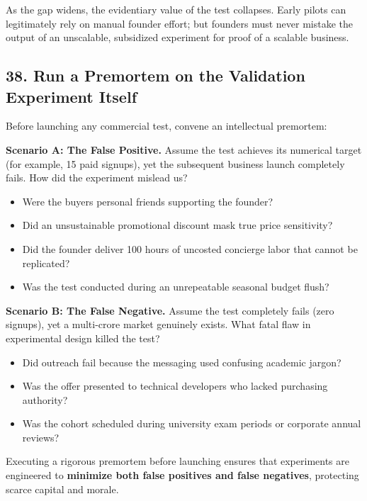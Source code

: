 As the gap widens, the evidentiary value of the test collapses. Early pilots can legitimately rely on manual founder effort; but founders must never mistake the output of an unscalable, subsidized experiment for proof of a scalable business.

\subsection*{38. Run a Premortem on the Validation Experiment Itself}

Before launching any commercial test, convene an intellectual premortem:

\textbf{Scenario A: The False Positive.} Assume the test achieves its numerical target (for example, 15 paid signups), yet the subsequent business launch completely fails. How did the experiment mislead us?
\begin{itemize}
    \item Were the buyers personal friends supporting the founder?
    \item Did an unsustainable promotional discount mask true price sensitivity?
    \item Did the founder deliver 100 hours of uncosted concierge labor that cannot be replicated?
    \item Was the test conducted during an unrepeatable seasonal budget flush?
\end{itemize}

\textbf{Scenario B: The False Negative.} Assume the test completely fails (zero signups), yet a multi-crore market genuinely exists. What fatal flaw in experimental design killed the test?
\begin{itemize}
    \item Did outreach fail because the messaging used confusing academic jargon?
    \item Was the offer presented to technical developers who lacked purchasing authority?
    \item Was the cohort scheduled during university exam periods or corporate annual reviews?
\end{itemize}

Executing a rigorous premortem before launching ensures that experiments are engineered to \textbf{minimize both false positives and false negatives}, protecting scarce capital and morale.
